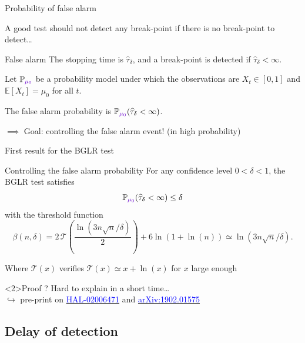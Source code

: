 \documentclass[11pt,english,ignorenonframetext,]{beamer}
\begin{document}
\begin{frame}{Probability of false alarm}

  A good test should not detect any break-point if there is no break-point to detect\ldots

  \begin{block}{False alarm}
    The stopping time is $\widehat{\tau}_\delta$,
    and a break-point is detected if $\widehat{\tau}_\delta < \infty$.

    Let $\mathbb{P}_{\textcolor{deeppurple}{\mu_0}}$ be a probability model under which the observations are $X_t \in[0,1]$
    and \textcolor{deeppurple}{$\mathbb{E}[X_t] = \mu_0$ for all $t$}.

    The \alert{false alarm probability} is $\mathbb{P}_{\textcolor{deeppurple}{\mu_0}}(\widehat{\tau}_\delta < \infty)$.
  \end{block}

  \alert{$\implies$ Goal: controlling the false alarm event!} (in high probability)

\end{frame}

\begin{frame}{First result for the BGLR test}

  \begin{block}{Controlling the false alarm probability}
    For any \alert{confidence level} $0<\delta<1$,
    the BGLR test satisfies
    \[ \mathbb{P}_{\textcolor{deeppurple}{\mu_0}}(\widehat{\tau}_\delta < \infty) \leq \delta \]
    with the threshold function
    \[ \beta(n,\delta)= 2\,\mathcal{T}\left(\frac{\ln(3n\sqrt{n}/\delta)}{2}\right) + 6\ln(1+\ln(n)) \simeq \ln(3n \sqrt{n}/\delta).\]
  \end{block}

  Where $\mathcal{T}(x)$ verifies $\mathcal{T}(x)\simeq x + \ln(x)$ for $x$ large enough

  \begin{exampleblock}<2>{Proof ?}
    Hard to explain in a short time\ldots\\
    $\hookrightarrow$ pre-print on
    \href{https://hal.inria.fr/hal-02006471}{\textcolor{blue}{HAL-02006471}}
    and
    \href{https://arxiv.org/abs/1902.01575}{\textcolor{blue}{arXiv:1902.01575}}
  \end{exampleblock}

\end{frame}

\subsection{\hfill{}Delay of detection\hfill{}}
\end{document}
